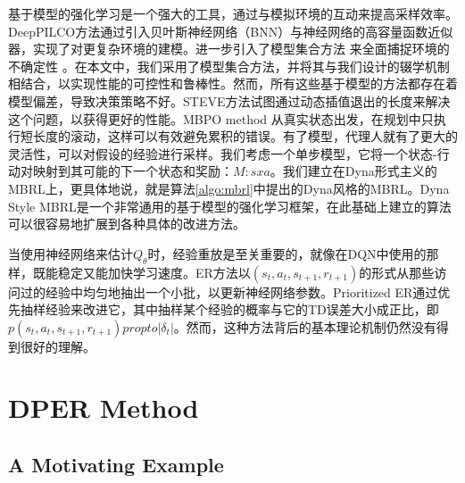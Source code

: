 基于模型的强化学习是一个强大的工具，通过与模拟环境的互动来提高采样效率。DeepPILCO方法\cite{gal2016improving}通过引入贝叶斯神经网络（BNN）与神经网络的高容量函数近似器，实现了对更复杂环境的建模\cite{blundell2015weight,mackay1995bayesian}。进一步引入了模型集合方法 \cite{kurutach2018model}来全面捕捉环境的不确定性 \cite{malik2019calibrated}。在本文中，我们采用了模型集合方法，并将其与我们设计的辍学机制相结合，以实现性能的可控性和鲁棒性。然而，所有这些基于模型的方法都存在着模型偏差，导致决策策略不好。STEVE方法\cite{buckman2018sample}试图通过动态插值退出的长度来解决这个问题，以获得更好的性能。MBPO method \cite{janner2019trust}从真实状态出发，在规划中只执行短长度的滚动，这样可以有效避免累积的错误。有了模型，代理人就有了更大的灵活性，可以对假设的经验进行采样。我们考虑一个单步模型，它将一个状态-行动对映射到其可能的下一个状态和奖励：$M:sxa$。我们建立在Dyna形式主义\cite{sutton1991integrated}的MBRL上，更具体地说，就是算法\ref{algo:mbrl}中提出的Dyna风格的MBRL。Dyna Style MBRL是一个非常通用的基于模型的强化学习框架，在此基础上建立的算法可以很容易地扩展到各种具体的改进方法。


当使用神经网络来估计$Q_\theta$时，经验重放是至关重要的，就像在DQN\cite{mnih2015human}中使用的那样，既能稳定又能加快学习速度。ER方法以$(s_t, a_t, s_{t+1}, r_{t+1})$的形式从那些访问过的经验中均匀地抽出一个小批，以更新神经网络参数。Prioritized ER\cite{schaul2016prioritized}通过优先抽样经验来改进它，其中抽样某个经验的概率与它的TD误差大小成正比，即$p(s_t, a_t, s_{t+1}, r_{t+1})propto |\delta_{t}|$。然而，这种方法背后的基本理论机制仍然没有得到很好的理解。

\section{DPER Method}

\subsection{A Motivating Example}

